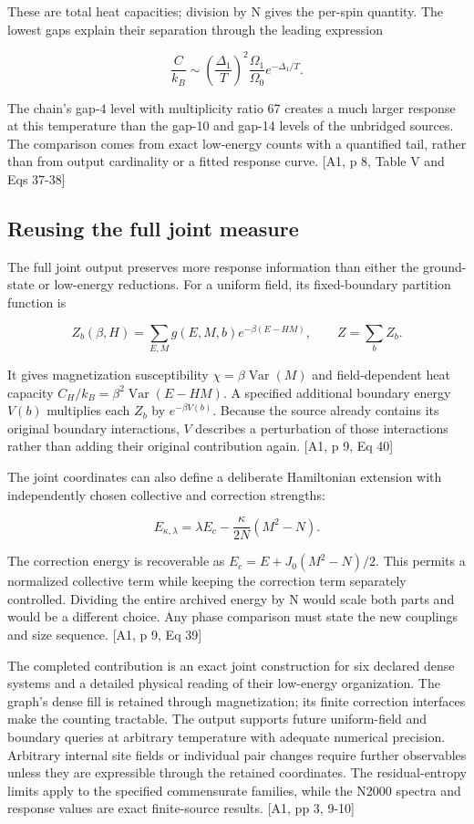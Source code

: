 These are total heat capacities; division by N gives the per-spin quantity. The lowest gaps explain their separation through the leading expression

\[\frac{C}{k_B}\sim\left(\frac{\Delta_1}{T}\right)^2\frac{\Omega_1}{\Omega_0}e^{-\Delta_1/T}.\]

The chain's gap-4 level with multiplicity ratio 67 creates a much larger response at this temperature than the gap-10 and gap-14 levels of the unbridged sources. The comparison comes from exact low-energy counts with a quantified tail, rather than from output cardinality or a fitted response curve. {[}A1, p 8, Table V and Eqs 37-38{]}

\subsection{Reusing the full joint measure}\label{reusing-the-full-joint-measure}

The full joint output preserves more response information than either the ground-state or low-energy reductions. For a uniform field, its fixed-boundary partition function is

\[Z_b(\beta,H)=\sum_{E,M}g(E,M,b)e^{-\beta(E-HM)},\qquad Z=\sum_bZ_b.\]

It gives magnetization susceptibility \(\chi=\beta\operatorname{Var}(M)\) and field-dependent heat capacity \(C_H/k_B=\beta^2\operatorname{Var}(E-HM)\). A specified additional boundary energy \(V(b)\) multiplies each \(Z_b\) by \(e^{-\beta V(b)}\). Because the source already contains its original boundary interactions, \(V\) describes a perturbation of those interactions rather than adding their original contribution again. {[}A1, p 9, Eq 40{]}

The joint coordinates can also define a deliberate Hamiltonian extension with independently chosen collective and correction strengths:

\[E_{\kappa,\lambda}=\lambda E_c-\frac{\kappa}{2N}(M^2-N).\]

The correction energy is recoverable as \(E_c=E+J_0(M^2-N)/2\). This permits a normalized collective term while keeping the correction term separately controlled. Dividing the entire archived energy by N would scale both parts and would be a different choice. Any phase comparison must state the new couplings and size sequence. {[}A1, p 9, Eq 39{]}

The completed contribution is an exact joint construction for six declared dense systems and a detailed physical reading of their low-energy organization. The graph's dense fill is retained through magnetization; its finite correction interfaces make the counting tractable. The output supports future uniform-field and boundary queries at arbitrary temperature with adequate numerical precision. Arbitrary internal site fields or individual pair changes require further observables unless they are expressible through the retained coordinates. The residual-entropy limits apply to the specified commensurate families, while the N2000 spectra and response values are exact finite-source results. {[}A1, pp 3, 9-10{]}
